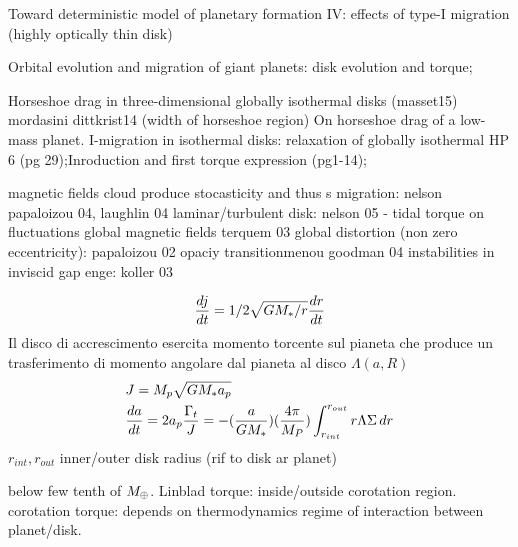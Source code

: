 \begin{workout}
Toward deterministic model of planetary formation IV: effects of type-I migration (highly optically thin disk)
\end{workout}

\begin{workout}
Orbital evolution and migration of giant planets: disk evolution and torque;
\end{workout}

\begin{workout}
Horseshoe drag in three-dimensional globally isothermal disks (masset15)
mordasini dittkrist14 (width of horseshoe region)
On horseshoe drag of a low-mass planet. I-migration in isothermal disks: relaxation of globally isothermal HP 6 (pg 29);Inroduction and first torque expression (pg1-14); 
\end{workout}

\begin{workout}
magnetic fields cloud produce stocasticity and thus s migration: nelson papaloizou 04, laughlin 04
laminar/turbulent disk: nelson 05 - tidal torque on fluctuations
global magnetic fields terquem 03
global distortion (non zero eccentricity): papaloizou 02
opaciy transitionmenou goodman 04
instabilities in inviscid gap enge: koller 03
\end{workout}

\begin{workout}
\begin{align}
\TDy{t}{j}=1/2\sqrt{GM_*/r}\TDy{t}{r}
\end{align}
Il disco di accrescimento esercita momento torcente sul pianeta che produce un trasferimento di momento angolare dal pianeta al disco $\Lambda(a,R)$
\begin{align*}
&J=M_p\sqrt{GM_*a_p}\\
&\TDy{t}{a}=2a_p\frac{\Gamma_t}{J}=-(\frac{a}{GM_*})(\frac{4\pi}{M_P})\int_{r_{int}}^{r_{out}}r\Lambda\Sigma\,dr
\end{align*}
$r_{int}, r_{out}$ inner/outer disk radius (rif to disk ar planet)
\end{workout}


\begin{workout}[M14:type I]
below few tenth of $\mearth{}$.
Linblad torque: inside/outside corotation region.
corotation torque: depends on thermodynamics regime of interaction between planet/disk.
\end{workout}

